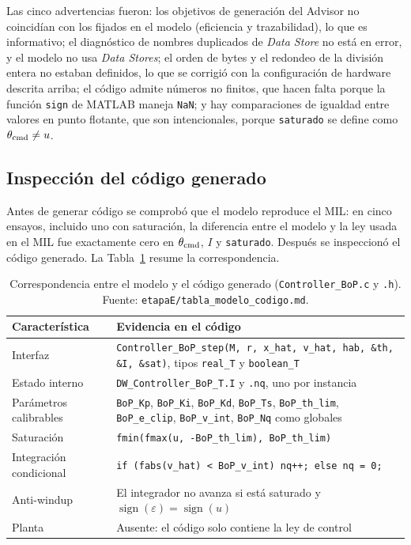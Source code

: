Las cinco advertencias fueron: los objetivos de generación del Advisor no coincidían con los
fijados en el modelo (eficiencia y trazabilidad), lo que es informativo; el diagnóstico de nombres
duplicados de \emph{Data Store} no está en error, y el modelo no usa \emph{Data Stores}; el orden
de bytes y el redondeo de la división entera no estaban definidos, lo que se corrigió con la
configuración de hardware descrita arriba; el código admite números no finitos, que hacen falta
porque la función \texttt{sign} de MATLAB maneja \texttt{NaN}; y hay comparaciones de igualdad
entre valores en punto flotante, que son intencionales, porque \texttt{saturado} se define
como $\theta_{\mathrm{cmd}} \ne u$.

\subsection{Inspección del código generado}

Antes de generar código se comprobó que el modelo reproduce el MIL: en cinco ensayos, incluido
uno con saturación, la diferencia entre el modelo y la ley usada en el MIL fue exactamente cero
en $\theta_{\mathrm{cmd}}$, $I$ y \texttt{saturado}. Después se inspeccionó el código generado. La
Tabla~\ref{tab:codigo} resume la correspondencia.

\begin{table}[!t]
\caption{Correspondencia entre el modelo y el código generado (\texttt{Controller\_BoP.c} y
\texttt{.h}). Fuente: \texttt{etapaE/tabla\_modelo\_codigo.md}.}
\label{tab:codigo}
\centering
\footnotesize
\setlength{\tabcolsep}{3pt}
\begin{tabular}{@{}p{}p{}@{}}
\toprule
\textbf{Característica} & \textbf{Evidencia en el código} \\
\midrule
Interfaz & \texttt{Controller\_BoP\_step(M, r, x\_hat, v\_hat, hab, \&th, \&I, \&sat)}, tipos \texttt{real\_T} y \texttt{boolean\_T} \\
Estado interno & \texttt{DW\_Controller\_BoP\_T.I} y \texttt{.nq}, uno por instancia \\
Parámetros calibrables & \texttt{BoP\_Kp}, \texttt{BoP\_Ki}, \texttt{BoP\_Kd}, \texttt{BoP\_Ts}, \texttt{BoP\_th\_lim}, \texttt{BoP\_e\_clip}, \texttt{BoP\_v\_int}, \texttt{BoP\_Nq} como globales \\
Saturación & \texttt{fmin(fmax(u, -BoP\_th\_lim), BoP\_th\_lim)} \\
Integración condicional & \texttt{if (fabs(v\_hat) < BoP\_v\_int) nq++; else nq = 0;} \\
Anti-windup & El integrador no avanza si está saturado y $\operatorname{sign}(\varepsilon) = \operatorname{sign}(u)$ \\
Planta & Ausente: el código solo contiene la ley de control \\
\bottomrule
\end{tabular}
\end{table}


